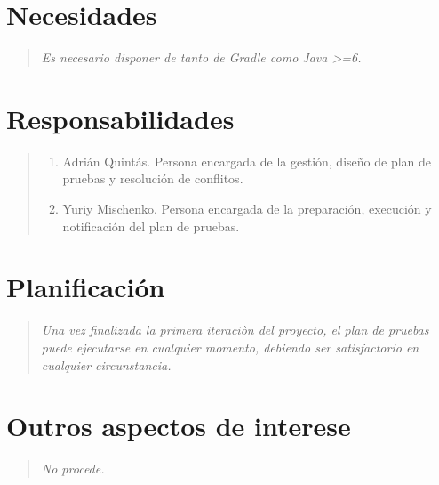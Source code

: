 \documentclass[DIV=calc,paper=a4,fontsize=11pt,onecolumn]{scrartcl}	 %
\newcommand{\hint}[1]{\begin{quote}\itshape #1 \end{quote}}
\begin{document}
\section{Necesidades}

\hint{Es necesario disponer de tanto de Gradle como Java >=6.}

\section{Responsabilidades}

\hint{
	\begin{enumerate}
		\item Adrián Quintás. Persona encargada de la gestión, diseño de plan de pruebas y resolución de conflitos.
		\item Yuriy Mischenko. Persona encargada de la preparación, execución y notificación del plan de pruebas.
	\end{enumerate}
}

\section{Planificación}

\hint{Una vez finalizada la primera iteraciòn del proyecto, el plan de pruebas puede ejecutarse en cualquier momento, debiendo ser satisfactorio en cualquier circunstancia.}

\section{Outros aspectos de interese}

\hint{No procede.}
\end{document}
